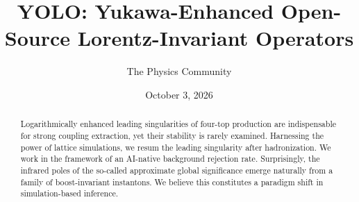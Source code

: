 \documentclass[11pt]{article}
\title{YOLO: Yukawa-Enhanced Open-Source Lorentz-Invariant Operators}
\author{The Physics Community}
\date{October 3, 2026}
\numberwithin{equation}{section}
\theoremstyle{definition}
\theoremstyle{remark}
\begin{document}
\maketitle
\begin{abstract}
Logarithmically enhanced leading singularities of four-top production
are indispensable for strong coupling extraction, yet their stability is
rarely examined. Harnessing the power of lattice simulations, we resum
the leading singularity after hadronization. We work in the framework of
an AI-native background rejection rate. Surprisingly, the infrared poles
of the so-called approximate global significance emerge naturally from a
family of boost-invariant instantons. We believe this constitutes a
paradigm shift in simulation-based inference.
\end{abstract}
\tableofcontents



\nocite{*}


\end{document}
